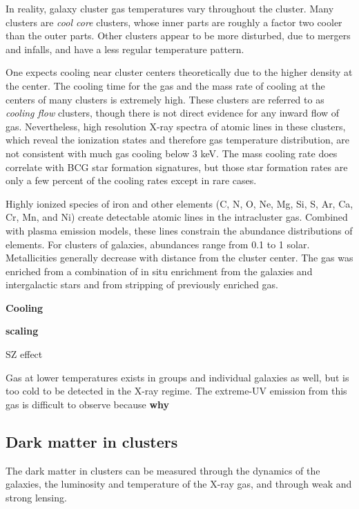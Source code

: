 In reality, galaxy cluster gas temperatures vary throughout the
cluster. Many clusters are {\it cool core} clusters, whose inner parts
are roughly a factor two cooler than the outer parts. Other clusters
appear to be more disturbed, due to mergers and infalls, and have a
less regular temperature pattern.

One expects cooling near cluster centers theoretically due to the
higher density at the center. The cooling time for the gas and the
mass rate of cooling at the centers of many clusters is extremely
high. These clusters are referred to as {\it cooling flow} clusters,
though there is not direct evidence for any inward flow of gas.
Nevertheless, high resolution X-ray spectra of atomic lines in these
clusters, which reveal the ionization states and therefore gas
temperature distribution, are not consistent with much gas cooling
below 3 keV. The mass cooling rate does correlate with BCG star
formation signatures, but those star formation rates are only a few
percent of the cooling rates except in rare cases.

Highly ionized species of iron and other elements (C, N, O, Ne, Mg,
Si, S, Ar, Ca, Cr, Mn, and Ni) create detectable atomic lines in the
intracluster gas. Combined with plasma emission models, these lines
constrain the abundance distributions of elements. For clusters of
galaxies, abundances range from 0.1 to 1 solar. Metallicities
generally decrease with distance from the cluster center. The gas was
enriched from a combination of in situ enrichment from the galaxies
and intergalactic stars and from stripping of previously enriched
gas. 


{\bf Cooling}

{\bf scaling}

SZ effect

Gas at lower temperatures exists in groups and individual galaxies as
well, but is too cold to be detected in the X-ray regime. The
extreme-UV emission from this gas is difficult to observe because {\bf
why}

\subsection{Dark matter in clusters}

The dark matter in clusters can be measured through the dynamics of
the galaxies, the luminosity and temperature of the X-ray gas, and
through weak and strong lensing.

